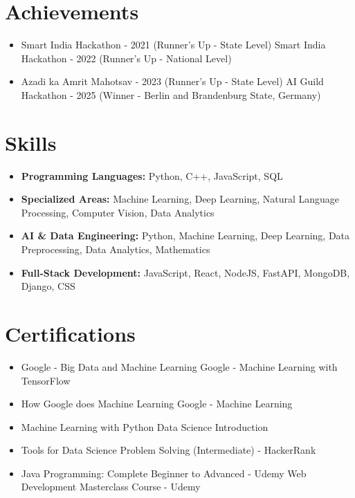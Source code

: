 \documentclass[a4paper,10pt]{article}
\begin{document}
\section*{Achievements}
\begin{itemize}
\item Smart India Hackathon - 2021 (Runner's Up - State Level) \hfill Smart India Hackathon - 2022 (Runner's Up - National Level)
\item Azadi ka Amrit Mahotsav - 2023 (Runner's Up - State Level) \hfill AI Guild Hackathon - 2025 (Winner - Berlin and Brandenburg State, Germany)
\end{itemize}

\section*{Skills}
\begin{itemize}
  \item \textbf{Programming Languages:} Python, C++, JavaScript, SQL
  \item \textbf{Specialized Areas:} Machine Learning, Deep Learning, Natural Language Processing, Computer Vision, Data Analytics
  \item \textbf{AI \& Data Engineering:} Python, Machine Learning, Deep Learning, Data Preprocessing, Data Analytics, Mathematics
  \item \textbf{Full-Stack Development:} JavaScript, React, NodeJS, FastAPI, MongoDB, Django, CSS
\end{itemize}

\section*{Certifications}
\begin{itemize}
\item Google - Big Data and Machine Learning \hfill Google - Machine Learning with TensorFlow
\item How Google does Machine Learning \hfill Google - Machine Learning
\item Machine Learning with Python \hfill Data Science Introduction
\item Tools for Data Science \hfill Problem Solving (Intermediate) - HackerRank
\item Java Programming: Complete Beginner to Advanced - Udemy \hfill Web Development Masterclass Course - Udemy
\end{itemize}
\end{document}
